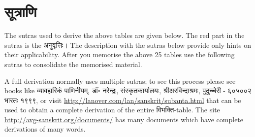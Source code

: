 \documentclass[leqno,fleqn,12pt]{article}%
\begin{document}
\clearpage


\section{सूत्राणि}
The sutras used to derive the above tables are given below. The red part in the sutras is the अनुवृत्तिः। The description with the sutras below provide only hints on their applicability. After you memorise the above 25 tables use the following sutras to consolidate the memorised material. 

A full derivation normally uses multiple sutras; to see this process please see books like व्यावहारिकं पाणिनीयम्, डॉ॰ नरेन्द्रः, संस्कृतकार्यालयः, श्रीअरविन्दाश्रमः, पुदुच्चेरी - ६०५००२ भारतः १९९९, or visit \url{http://lanover.com/lan/sanskrit/subanta.html} that can be used to obtain a complete derivation of the entire विभक्ति-table. The site \url{http://avg-sanskrit.org/documents/} has many documents which have complete derivations of many words.


\begingroup

\end{document}
